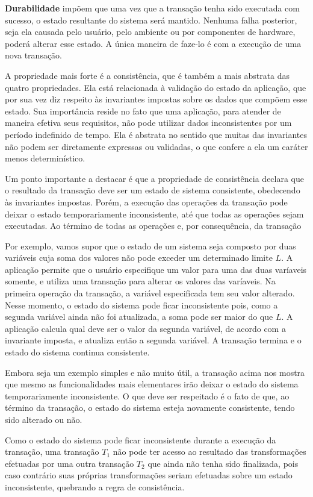 \documentclass[11pt,twoside,a4paper]{book}
\begin{document}
\textbf{Durabilidade} impõem que uma vez que a transação tenha sido executada com sucesso, o estado resultante do sistema será mantido. Nenhuma falha posterior, seja ela causada pelo usuário, pelo ambiente ou por componentes de hardware, poderá alterar esse estado. A única maneira de faze-lo é com a execução de uma nova transação.

A propriedade mais forte é a consistência, que é também a mais abstrata das quatro propriedades. Ela está relacionada à validação do estado da aplicação, que por sua vez diz respeito às invariantes impostas sobre os dados que compõem esse estado. Sua importância reside no fato que uma aplicação, para atender de maneira efetiva seus requisitos, não pode utilizar dados inconsistentes por um período indefinido de tempo. Ela é abstrata no sentido que muitas das invariantes não podem ser diretamente expressas ou validadas, o que confere a ela um caráter menos determinístico.

Um ponto importante a destacar é que a propriedade de consistência declara que o resultado da transação deve ser um estado de sistema consistente, obedecendo às invariantes impostas. Porém, a execução das operações da transação pode deixar o estado temporariamente inconsistente, até que todas as operações sejam executadas. Ao término de todas as operações e, por consequência, da transação

Por exemplo, vamos supor que o estado de um sistema seja composto por duas variáveis cuja soma dos valores não pode exceder um determinado limite $L$. A aplicação permite que o usuário especifique um valor para uma das duas varíaveis somente, e utiliza uma transação para alterar os valores das varíaveis. Na primeira operação da transação, a variável especificada tem seu valor alterado. Nesse momento, o estado do sistema pode ficar inconsistente pois, como a segunda variável ainda não foi atualizada, a soma pode ser maior do que $L$. A aplicação calcula qual deve ser o valor da segunda variável, de acordo com a invariante imposta, e atualiza então a segunda variável. A transação termina e o estado do sistema continua consistente.

Embora seja um exemplo simples e não muito útil, a transação acima nos mostra que mesmo as funcionalidades mais elementares irão deixar o estado do sistema temporariamente inconsistente. O que deve ser respeitado é o fato de que, ao término da transação, o estado do sistema esteja novamente consistente, tendo sido alterado ou não.

Como o estado do sistema pode ficar inconsistente durante a execução da transação, uma transação $T_1$ não pode ter acesso ao resultado das transformações efetuadas por uma outra transação $T_2$ que ainda não tenha sido finalizada, pois caso contrário suas próprias transformações seriam efetuadas sobre um estado inconsistente, quebrando a regra de consistência.
\end{document}
